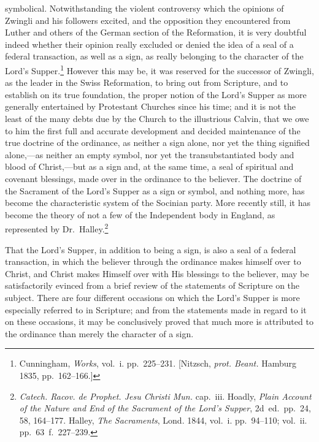 \documentclass[
  english,
]{book}
\begin{document}
symbolical. Notwithstanding the violent controversy which the opinions of Zwingli and his followers excited, and the opposition they encountered from Luther and others of the German section of the Reformation, it is very doubtful indeed whether their opinion really excluded or denied the idea of a seal of a federal transaction, as well as a sign, as really belonging to the character of the Lord's Supper.\footnote{Cunningham, \emph{Works}, vol.~i. pp.~225--231. {[}Nitzsch, \emph{prot. Beant.} Hamburg 1835, pp.~162--166.{]}} However this may be, it was reserved for the successor of Zwingli, as the leader in the Swiss Reformation, to bring out from Scripture, and to establish on its true foundation, the proper notion of the Lord's Supper as more generally entertained by Protestant Churches since his time; and it is not the least of the many debts due by the Church to the illustrious Calvin, that we owe to him the first full and accurate development and decided maintenance of the true doctrine of the ordinance, as neither a sign alone, nor yet the thing signified alone,---as neither an empty symbol, nor yet the transubstantiated body and blood of Christ,---but as a sign and, at the same time, a seal of spiritual and covenant blessings, made over in the ordinance to the believer. The doctrine of the Sacrament of the Lord's Supper as a sign or symbol, and nothing more, has become the characteristic system of the Socinian party. More recently still, it has become the theory of not a few of the Independent body in England, as represented by Dr.~Halley.\footnote{\emph{Catech. Racov. de Prophet. Jesu Christi Mun.} cap.~iii. Hoadly, \emph{Plain Account of the Nature and End of the Sacrament of the Lord's Supper}, 2d~ed.~pp.~24, 58, 164--177. Halley, \emph{The Sacraments}, Lond. 1844, vol.~i. pp.~94--110; vol.~ii. pp.~63~f.~227--239.}

That the Lord's Supper, in addition to being a sign, is also a seal of a federal transaction, in which the believer through the ordinance makes himself over to Christ, and Christ makes Himself over with His blessings to the believer, may be satisfactorily evinced from a brief review of the statements of Scripture on the subject. There are four different occasions on which the Lord's Supper is more especially referred to in Scripture; and from the statements made in regard to it on these occasions, it may be conclusively proved that much more is attributed to the ordinance than merely the character of a sign.
\end{document}
